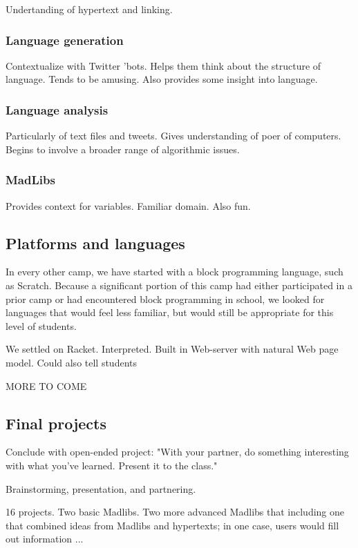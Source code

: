 Undertanding of hypertext and linking.

\subsubsection{Language generation}

Contextualize with Twitter 'bots.  Helps them think about
the structure of language.  Tends to be amusing.  Also provides
some insight into language.

\subsubsection{Language analysis}

Particularly of text files and tweets.  Gives understanding of poer
of computers.  Begins to involve a broader range of algorithmic
issues.

\subsubsection{MadLibs}

Provides context for variables.  Familiar domain.  Also fun.

\subsection{Platforms and languages}

In every other camp, we have started with a block programming language,
such as Scratch.  Because a significant portion of this camp had
either participated in a prior camp or had encountered block
programming in school, we looked for languages that would feel less
familiar, but would still be appropriate for this level of students.

We settled on Racket.  Interpreted.  Built in Web-server with natural
Web page model.  Could also tell students

MORE TO COME

\subsection{Final projects}

Conclude with open-ended project: "With your partner, do something
interesting with what you've learned.  Present it to the class."

Brainstorming, presentation, and partnering.

16 projects.  Two basic Madlibs.  Two
more advanced Madlibs that including one that combined ideas from Madlibs 
and hypertexts; in one case, users would fill out information ...

